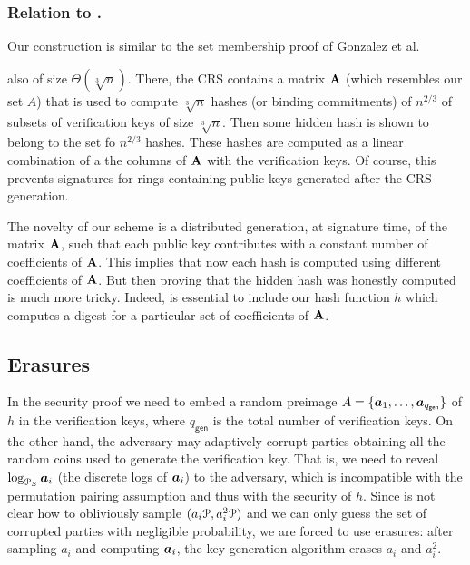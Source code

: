 \subsubsection{Relation to \cite{AC:GonHevRaf15}.}
Our construction is similar to the set membership proof of Gonzalez et al.~{\cite[Appendix D.2]{AC:GonHevRaf15} also of size $\Theta(\sqrt[3]{n})$. There, the CRS contains a matrix $\mathbf{{A}}$ (which resembles our set $A$) that is used to compute $\sqrt[3]{n}$ hashes (or binding commitments) of $n^{2/3}$ of subsets of verification keys of size $\sqrt[3]{n}$. Then some hidden hash is shown to belong to the set fo $n^{2/3}$ hashes. These hashes are computed as a linear combination of a the columns of $\mathbf{{A}}$ with the verification keys.
Of course, this prevents signatures for rings containing public keys generated after the CRS generation.

The novelty of our scheme is a distributed generation, at signature time, of the matrix $\mathbf{{A}}$, such that each public key contributes with a constant number of coefficients of $\mathbf{{A}}$. This implies that now each hash is computed using different coefficients of $\mathbf{{A}}$. But then proving that the hidden hash was honestly computed is much more tricky. Indeed, is essential to include our hash function $h$ which computes a digest for a particular set of coefficients of $\mathbf{{A}}$.


\subsection{Erasures} \label{sect:erasures}
In the security proof we need to embed a random preimage $A=\{{\boldsymbol{a}}_1,\ldots,\allowbreak {\boldsymbol{a}}_{q_{\mathsf{gen}}}\}$ of $h$ in the verification keys, where $q_{\mathsf{gen}}$ is the total number of verification keys. On the other hand, the adversary may adaptively corrupt parties obtaining all the random coins used to generate the verification key. That is, we need to reveal $\log_{\mathcal{P}_S} {\boldsymbol{a}}_i$ (the discrete logs of ${\boldsymbol{a}}_i$) to the adversary, which is incompatible with the permutation pairing assumption and thus with the security of $h$. Since is not clear how to obliviously sample $(a_i\mathcal{P},a^2_i\mathcal{P})$ and we can only guess the set of corrupted parties with negligible probability, we are forced to use erasures: after sampling $a_i$ and computing ${\boldsymbol{a}}_i$, the key generation algorithm erases $a_i$ and $a_i^2$.

}
